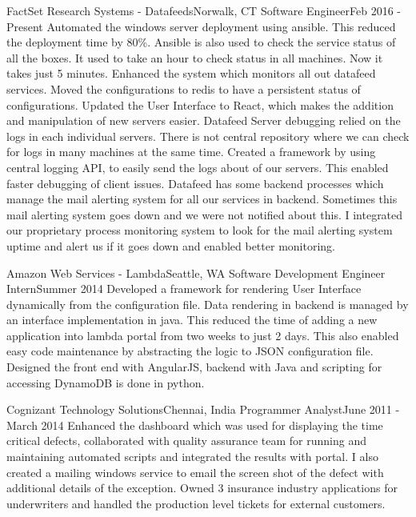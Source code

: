     \resumeSubheading
      {FactSet Research Systems - Datafeeds}{Norwalk, CT}
      {Software Engineer}{Feb 2016 - Present}
      \resumeItemListStart
          {Automated the windows server deployment using ansible. This reduced the deployment time by 80\%. Ansible is also used to check the service status of all the boxes. It used to take an hour to check status in all machines. Now it takes just 5 minutes.}
          {Enhanced the system which monitors all out datafeed services. Moved the configurations to redis to have a persistent status of configurations. Updated the User Interface to React, which makes the addition and manipulation of new servers easier.}
          {Datafeed Server debugging relied on the logs in each individual servers. There is not central repository where we can check for logs in many machines at the same time. Created a framework by using central logging API, to easily send the logs about of our servers. This enabled faster debugging of client issues. }
          {Datafeed has some backend processes which manage the mail alerting system for all our services in backend. Sometimes this mail alerting system goes down and we were not notified about this. I integrated our proprietary process monitoring system to look for the mail alerting system uptime and alert us if it goes down and enabled better monitoring. }
      \resumeItemListEnd

    \resumeSubheading
      {Amazon Web Services - Lambda}{Seattle, WA}
      {Software Development Engineer Intern}{Summer 2014}
      \resumeItemListStart
          {Developed a framework for rendering User Interface dynamically from the configuration file. Data rendering in backend is managed by an interface implementation in java. This reduced the time of adding a new application into lambda portal from two weeks to just 2 days. This also enabled easy code maintenance by abstracting the logic to JSON configuration file. Designed the front end with AngularJS, backend with Java and scripting for accessing DynamoDB is done in python. }
      \resumeItemListEnd

    \resumeSubheading
      {Cognizant Technology Solutions}{Chennai, India}
      {Programmer Analyst}{June 2011 - March 2014}
      \resumeItemListStart
          {Enhanced the dashboard which was used for displaying the time critical defects, collaborated with quality assurance team for running and maintaining automated scripts and integrated the results with portal. I also created a mailing windows service to email the screen shot of the defect with additional details of the exception.}
          {Owned 3 insurance industry applications for underwriters and handled the production level tickets for external customers.}
      \resumeItemListEnd

